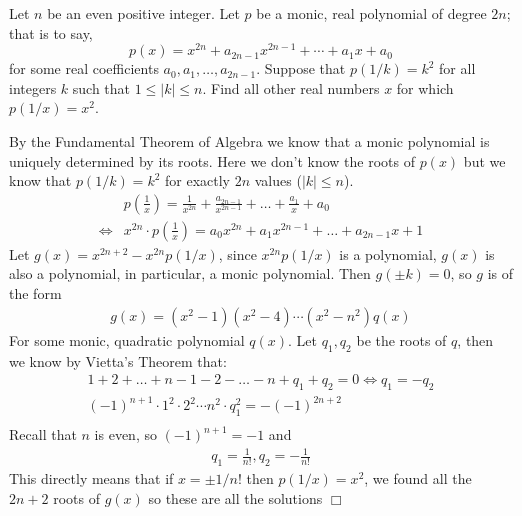 \begin{problem}[A][9][Putnam 2023 A2]
    Let $n$ be an even positive integer. Let $p$ be a monic, real polynomial of degree $2n$; that is to say, 
    \[
    p(x) = x^{2n} + a_{2n-1}x^{2n-1} + \cdots + a_1x + a_0
    \]
    for some real coefficients $a_0, a_1, \ldots, a_{2n-1}$. Suppose that $p(1/k) = k^2$ for all integers $k$ such that $1 \leq |k| \leq n$. Find all other real numbers $x$ for which $p(1/x) = x^2$.
\end{problem}

\begin{solution}[$\pm 1/n!$]
    By the Fundamental Theorem of Algebra we know that a monic polynomial is uniquely determined by its roots. Here we don't know the roots of $p(x)$ but we know that $p(1/k)=k^2$ for exactly $2n$ values ($|k| \leq n$). 
    \begin{align*}
        &p \left( \frac{1}{x}\right) = \frac{1}{x^{2n}} + \frac{a_{2n-1}}{x^{2n-1}}+\ldots+ \frac{a_1}{x}+a_0 \\
        \iff &x^{2n} \cdot p\left( \frac{1}{x}\right) = a_0x^{2n}+a_1x^{2n-1}+\ldots+a_{2n-1}x+1 
    \end{align*}
    Let $g(x) = x^{2n+2}-x^{2n}p(1/x)$, since $x^{2n}p(1/x)$ is a polynomial, $g(x)$ is also a polynomial, in particular, a monic polynomial. Then $g(\pm k) = 0$, so $g$ is of the form
    \begin{align*}
        g(x) = (x^2-1)(x^2-4)\cdots(x^2-n^2)q(x)
    \end{align*}
    For some monic, quadratic polynomial $q(x)$. Let $q_1,q_2$ be the roots of $q$, then we know by Vietta's Theorem that:
    \begin{align*}
        1+2+\ldots+n-1-2-\ldots-n +q_1+q_2=0 \iff q_1=-q_2 \\
        (-1)^{n+1}\cdot 1^2 \cdot2^2 \cdots n^2 \cdot q_1^2 = -(-1)^{2n+2} \\
    \end{align*}
    Recall that $n$ is even, so $ (-1)^{n+1}=-1$ and
    \begin{align*}
        q_1 = \frac{1}{n!} , q_2=-\frac{1}{n!}
    \end{align*}
    This directly means that if $x=\pm 1/n!$ then $p(1/x)=x^2$, we found all the $2n+2$ roots of $g(x)$ so these are all the solutions $\Box$
\end{solution}

